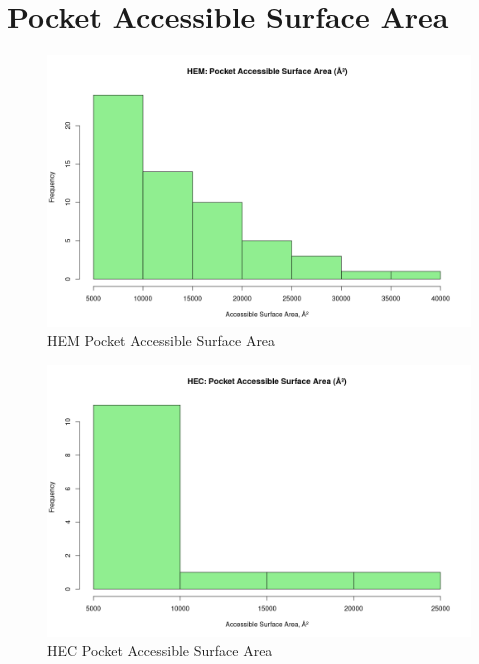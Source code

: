 \section{Pocket Accessible Surface Area}
	\begin{figure}
		\caption{HEM Pocket Accessible Surface Area}
		\label{figs:HEM_pocketAccSA}
		\includegraphics[width=\linewidth]{7A/HEM_pocketAccSA}
	\end{figure}

	\begin{figure}
		\caption{HEC Pocket Accessible Surface Area}
		\label{figs:HEC_pocketAccSA}
		\includegraphics[width=\linewidth]{7A/HEC_pocketAccSA}
	\end{figure}

